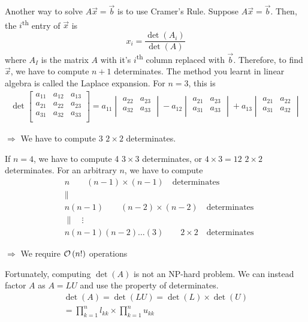 Another way to solve $A\Vec{x}=\Vec{b}$ is to use Cramer's Rule.
Suppose $A\Vec{x}=\Vec{b}$. 
Then, the $i$\textsuperscript{th} entry of $\Vec{x}$ is 
%
\begin{equation*}
	x_i = \frac{\det(A_i)}{\det(A)}
\end{equation*}
%
where $A_I$ is the matrix $A$ with it's 
$i$\textsuperscript{th} column replaced with $\Vec{b}$. 
Therefore, to find $\Vec{x}$, we have to compute $n+1$ determinates. 
The method you learnt in linear algebra is called the Laplace expansion. 
For $n=3$, this is 
%
\begin{align*}
  \det
  \begin{bmatrix}
    a_{11} & a_{12} & a_{13} \\ 
    a_{21} & a_{22} & a_{23} \\ 
    a_{31} & a_{32} & a_{33} \\ 
  \end{bmatrix}
  =
  a_{11}
  \begin{vmatrix}
    a_{22} & a_{23} \\ 
    a_{32} & a_{33} \\ 
  \end{vmatrix}
  -
    a_{12}
  \begin{vmatrix}
    a_{21} & a_{23} \\ 
    a_{31} & a_{33} \\ 
  \end{vmatrix}
  +
    a_{13}
  \begin{vmatrix}
    a_{21} & a_{22} \\ 
    a_{31} & a_{32} \\ 
  \end{vmatrix}
\end{align*}
%
\begin{displayquote}
  $\Rightarrow$ We have to compute 3 $2\times2$ determinates. 
\end{displayquote}
%
If $n=4$, we have to compute 4 $3\times3$ determinates, or $4\times3=12$
$2\times2$ determinates. For an arbitrary $n$, we have to compute
\begin{align*}
  &n \qquad (n-1)\times(n-1) \quad \text{determinates} \\
  & \parallel\\
  & n(n-1) \qquad (n-2)\times(n-2) \quad \text{determinates}\\
  & \parallel \quad \vdots\\
  & n(n-1)(n-2) \ldots (3) \qquad 2\times2 \quad \text{determinates}
\end{align*}
%
\begin{displayquote}
$\Rightarrow$ We require $\mathcal{O}\left(n!\right)$ operations
\end{displayquote}
%
Fortunately, computing $\det(A)$ is not an NP-hard problem. 
We can instead factor $A$ as $A=LU$ and use the property of determinates.
%
\begin{gather*}
  \det(A) = \det(LU) = \det(L) \times \det(U)\\
  = \prod_{k=1}^n l_{kk} \times \prod_{k=1}^n u_{kk}
\end{gather*}

